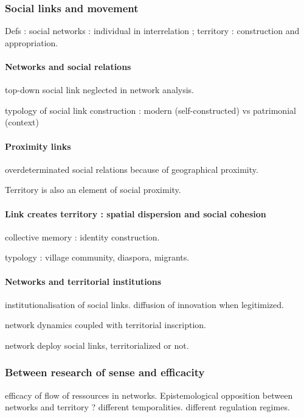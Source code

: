 \subsubsection*{Social links and movement}


Defs : social networks : individual in interrelation ; territory : construction and appropriation.

\paragraph{Networks and social relations}

top-down social link neglected in network analysis.

typology of social link construction : modern (self-constructed) vs patrimonial (context)

\paragraph{Proximity links}

overdeterminated social relations because of geographical proximity. 

Territory is also an element of social proximity.

\paragraph{Link creates territory : spatial dispersion and social cohesion}

collective memory : identity construction.

typology : village community, diaspora, migrants.

\paragraph{Networks and territorial institutions}


institutionalisation of social links. diffusion of innovation when legitimized.

network dynamics coupled with territorial inscription.

network deploy social links, territorialized or not.


\subsubsection*{Between research of sense and efficacity}

efficacy of flow of ressources in networks. Epistemological opposition between networks and territory ? different temporalities. different regulation regimes.

